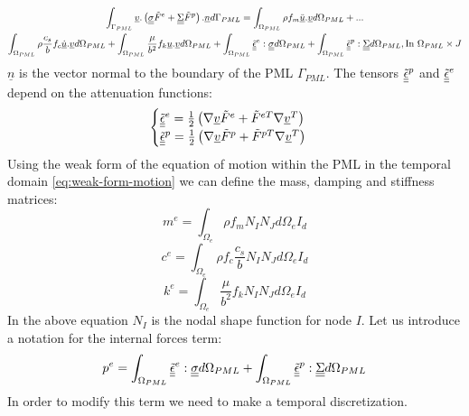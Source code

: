 \begin{multline}
\int_{\Gamma_{PML}} \underline{v} .\left(\underline{\underline{\sigma}}\tilde{F}^e + \underline{\underline{\Sigma}}\tilde{F}^p \right).\underline{n} d\Gamma_{PML}  = \int_{\Omega_{PML}} \rho f_m \underline{\ddot{u}} . \underline{v} d\Omega_{PML} + ... \nonumber\\
\int_{\Omega_{PML}} \rho \frac{c_s}{b} f_c \underline{\dot{u}} . \underline{v} d\Omega_{PML} +  \int_{\Omega_{PML}} \frac{\mu}{b^2}f_k \underline{u} . \underline{v} d\Omega_{PML} +\int_{\Omega_{PML}} \underline{\underline{\tilde{\epsilon}}}^e : \underline{\underline{\sigma}} d\Omega_{PML} + \int_{\Omega_{PML}} \underline{\underline{\tilde{\epsilon}}}^p : \underline{\underline{\Sigma}} d\Omega_{PML},  \text{In } \Omega_{PML} \times J
\end{multline}
$\underline{n}$ is the vector normal to the boundary of the PML $\Gamma_{PML}$. The tensors $\underline{\underline{\tilde{\epsilon}}}^p$ and $\underline{\underline{\tilde{\epsilon}}}^e$ depend on the attenuation functions:
\begin{equation}
\begin{cases}
\underline{\underline{\tilde{\epsilon}}}^e = \frac{1}{2}\left(\nabla \underline{v} \tilde{F}^e + \tilde{F}^{eT} \nabla \underline{v}^T  \right) \\
\underline{\underline{\tilde{\epsilon}}}^p = \frac{1}{2}\left(\nabla \underline{v} \tilde{F}^p + \tilde{F}^{pT} \nabla \underline{v}^T  \right)
\end{cases}
\label{eq:weak-first-eq}
\end{equation}
Using the weak form of the equation of motion within the PML in the temporal domain \ref{eq:weak-form-motion} we can define the mass, damping and stiffness matrices:
\begin{equation}
m^{e} = \int_{\Omega_e} \rho f_m N_I N_J d\Omega_e I_d
\label{eq:2Dpml-elem-mass}
\end{equation}
\begin{equation}
 c^{e} = \int_{\Omega_e} \rho f_c \frac{c_s}{b} N_I N_J d\Omega_e I_d
 \label{eq:2Dpml-elem-damp}
\end{equation}
\begin{equation}
  k^{e} = \int_{\Omega_e} \frac{\mu}{b^2} f_k N_I N_J d\Omega_e I_d 
  \label{eq:2Dpml-elem-stiff}
\end{equation}
In the above equation $N_I$ is the nodal shape function for node $I$.
Let us introduce a notation for the internal forces term: 
\begin{equation}
p^e = \int_{\Omega_{PML}} \underline{\underline{\tilde{\epsilon}}}^e : \underline{\underline{\sigma}} d\Omega_{PML} + \int_{\Omega_{PML}} \underline{\underline{\tilde{\epsilon}}}^p : \underline{\underline{\Sigma}} d\Omega_{PML}
\end{equation}
In order to modify this term we need to make a temporal discretization.
